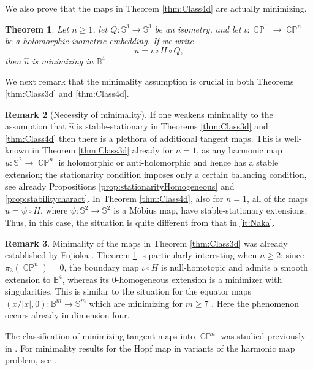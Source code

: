 \documentclass[11pt]{article}
\theoremstyle{plain}
\numberwithin{equation}{section}
\newtheorem{theorem}{Theorem}[section]
\theoremstyle{definition}
\newtheorem{remark}[theorem]{Remark}
\def \mb{\mathbb}
\DeclareMathOperator{\CP}{\mathbb{CP}}
\begin{document}
We also prove that the maps in Theorem \ref{thm:Class4d} are actually minimizing.

\begin{theorem}
    \label{thm:HopfMin}
    Let $n\geq1$, let $Q\colon\mb S^3\to\mb S^3$ be an isometry, and let $\iota\colon\CP^1\to\CP^n$ be a holomorphic isometric embedding. If we write
    \[
        u=\iota\circ H\circ Q,
    \]
    then $\hat u$ is minimizing in $\mb B^4$.
\end{theorem}


We next remark that the minimality assumption is crucial in both Theorems \ref{thm:Class3d} and \ref{thm:Class4d}.

\begin{remark}[Necessity of minimality]\label{rmk:minim}
If one weakens minimality to the assumption that $\hat u$ is stable-stationary in Theorems \ref{thm:Class3d} and \ref{thm:Class4d} then there is a plethora of additional tangent maps. This is well-known in Theorem \ref{thm:Class3d} already for $n=1$, as any harmonic map $u\colon \mb S^2\to \CP^n$ is holomorphic or anti-holomorphic and hence has a stable extension; the stationarity condition imposes only a certain balancing condition, see already Propositions \ref{prop:stationarityHomogeneous} and \ref{prop:stabilitycharact}. In Theorem \ref{thm:Class4d}, also for $n=1$, all of the maps $u=\psi \circ H$, where $\psi\colon \mb S^2\to \mb S^2$ is a M\"obius map, have stable-stationary extensions. Thus, in this case, the situation is quite different from that in \ref{it:Naka}.
\end{remark}

\begin{remark}
    \label{rmk:modelmin}
    Minimality of the maps in Theorem \ref{thm:Class3d} was already established by Fujioka \cite{Fujioka1993}. Theorem \ref{thm:HopfMin} is particularly interesting when $n\geq2$: since $\pi_3(\CP^n)=0$, the boundary map $\iota\circ H$ is null-homotopic and admits a smooth extension to $\mb B^4$, whereas its $0$-homogeneous extension is a minimizer with singularities. This is similar to the situation for the equator maps $(x/|x|,0)\colon\mb B^m\to\mb S^m$ which are minimizing for $m\geq7$ \cite{JagerKaul1983}. Here the phenomenon occurs already in dimension four.
\end{remark}

The classification of minimizing tangent maps into $\CP^n$ was studied previously in \cite{Fujioka1993}. For minimality results for the Hopf map in variants of the harmonic map problem, see \cite{GuerraLamyZemas2025,Riviere1998}.
\end{document}
